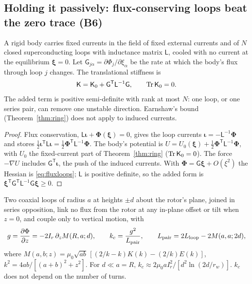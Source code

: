 \subsection{Holding it passively: flux-conserving loops beat the zero trace (B6)}
\begin{theorem}\label{thm:fluxloops}
A rigid body carries fixed currents in the field of fixed external currents and of $N$ closed superconducting loops with inductance matrix
$\mathsf L$, cooled with no current at the equilibrium $\boldsymbol\xi=0$. Let $\mathsf G_{j\alpha}=\partial\Phi_j/\partial\xi_\alpha$ be the rate at which
the body's flux through loop $j$ changes. The translational stiffness is
\begin{equation}
\mathsf K=\mathsf K_0+\mathsf G^{\mathsf T}\mathsf L^{-1}\mathsf G,\qquad \operatorname{Tr}\mathsf K_0=0 .\label{eq:fluxloops}
\end{equation}
The added term is positive semi-definite with rank at most $N$: one loop, or one series pair, can remove one unstable direction.
Earnshaw's bound (Theorem~\ref{thm:ring}) does not apply to induced currents.
\end{theorem}
\begin{proof}
Flux conservation, $\mathsf L\boldsymbol\iota+\boldsymbol\Phi(\boldsymbol\xi)=0$, gives the loop currents $\boldsymbol\iota=-\mathsf L^{-1}\boldsymbol\Phi$ and stores
$\tfrac12\boldsymbol\iota^{\mathsf T}\mathsf L\boldsymbol\iota=\tfrac12\boldsymbol\Phi^{\mathsf T}\mathsf L^{-1}\boldsymbol\Phi$. The body's potential is
$U=U_0(\boldsymbol\xi)+\tfrac12\boldsymbol\Phi^{\mathsf T}\mathsf L^{-1}\boldsymbol\Phi$, with $U_0$ the fixed-current part of Theorem~\ref{thm:ring}
($\operatorname{Tr}\mathsf K_0=0$). The force $-\nabla U$ includes $\mathsf G^{\mathsf T}\boldsymbol\iota$, the push of the induced currents. With
$\boldsymbol\Phi=\mathsf G\boldsymbol\xi+O(\xi^2)$ the Hessian is \eqref{eq:fluxloops}; $\mathsf L$ is positive definite, so the added form is
$\boldsymbol\xi^{\mathsf T}\mathsf G^{\mathsf T}\mathsf L^{-1}\mathsf G\boldsymbol\xi\ge0$.
\end{proof}
\begin{corollary}\label{cor:nullflux}
Two coaxial loops of radius $a$ at heights $\pm d$ about the rotor's plane, joined in series opposition, link no flux from the rotor at any
in-plane offset or tilt when $z=0$, and couple only to vertical motion, with
\begin{equation}
g=\frac{\partial\Phi}{\partial z}=-2I_r\,\partial_zM(R,a;d),\qquad k_c=\frac{g^2}{L_{\rm pair}},\qquad L_{\rm pair}=2L_{\rm loop}-2M(a,a;2d),
\label{eq:nullflux}
\end{equation}
where $M(a,b;z)=\mu_0\sqrt{ab}\,[(2/k-k)K(k)-(2/k)E(k)]$, $k^2=4ab/[(a+b)^2+z^2]$. For $d\ll a=R$,
$k_c\approx2\mu_0aI_r^2/[d^2\ln(2d/r_w)]$. $k_c$ does not depend on the number of turns.
\end{corollary}
